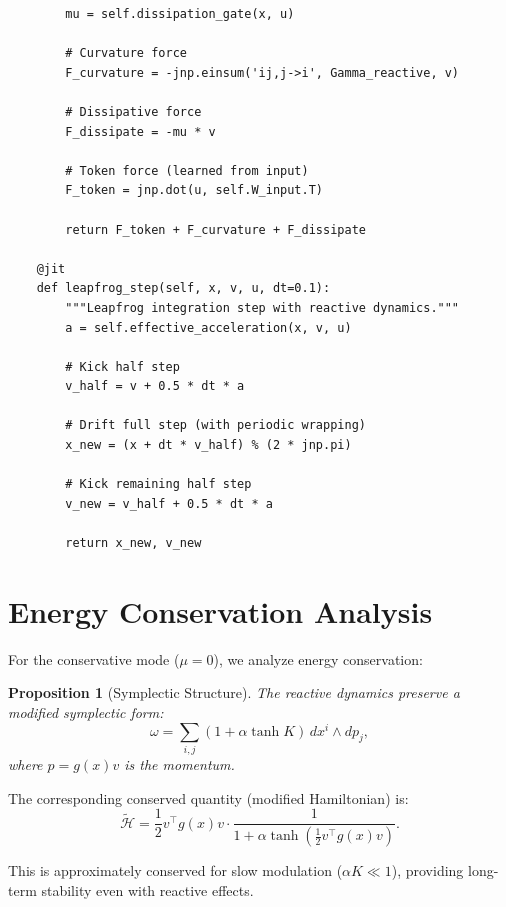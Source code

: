 \documentclass[12pt,letterpaper,twoside]{article}
\newtheorem{prop}{Proposition}[section]
\begin{document}
\begin{verbatim}
        mu = self.dissipation_gate(x, u)
        
        # Curvature force
        F_curvature = -jnp.einsum('ij,j->i', Gamma_reactive, v)
        
        # Dissipative force
        F_dissipate = -mu * v
        
        # Token force (learned from input)
        F_token = jnp.dot(u, self.W_input.T)
        
        return F_token + F_curvature + F_dissipate
    
    @jit
    def leapfrog_step(self, x, v, u, dt=0.1):
        """Leapfrog integration step with reactive dynamics."""
        a = self.effective_acceleration(x, v, u)
        
        # Kick half step
        v_half = v + 0.5 * dt * a
        
        # Drift full step (with periodic wrapping)
        x_new = (x + dt * v_half) % (2 * jnp.pi)
        
        # Kick remaining half step
        v_new = v_half + 0.5 * dt * a
        
        return x_new, v_new
\end{verbatim}

\section{Energy Conservation Analysis}

For the conservative mode ($\mu = 0$), we analyze energy conservation:

\begin{prop}[Symplectic Structure]
The reactive dynamics preserve a modified symplectic form:
\[
\omega = \sum_{i,j} (1 + \alpha \tanh K) \, dx^i \wedge dp_j,
\]
where $p = g(x)v$ is the momentum.
\end{prop}

The corresponding conserved quantity (modified Hamiltonian) is:
\[
\tilde{\mathcal{H}} = \frac{1}{2} v^\top g(x) v \cdot \frac{1}{1 + \alpha \tanh\left(\frac{1}{2} v^\top g(x) v\right)}.
\]

This is approximately conserved for slow modulation ($\alpha K \ll 1$), providing long-term stability even with reactive effects.
\end{document}
